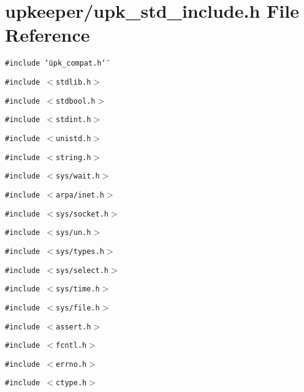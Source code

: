 \section{upkeeper/upk\_\-std\_\-include.h File Reference}
\label{upk__std__include_8h}
{\tt \#include \char`\"{}upk\_\-compat.h\char`\"{}}\par
{\tt \#include $<$stdlib.h$>$}\par
{\tt \#include $<$stdbool.h$>$}\par
{\tt \#include $<$stdint.h$>$}\par
{\tt \#include $<$unistd.h$>$}\par
{\tt \#include $<$string.h$>$}\par
{\tt \#include $<$sys/wait.h$>$}\par
{\tt \#include $<$arpa/inet.h$>$}\par
{\tt \#include $<$sys/socket.h$>$}\par
{\tt \#include $<$sys/un.h$>$}\par
{\tt \#include $<$sys/types.h$>$}\par
{\tt \#include $<$sys/select.h$>$}\par
{\tt \#include $<$sys/time.h$>$}\par
{\tt \#include $<$sys/file.h$>$}\par
{\tt \#include $<$assert.h$>$}\par
{\tt \#include $<$fcntl.h$>$}\par
{\tt \#include $<$errno.h$>$}\par
{\tt \#include $<$ctype.h$>$}\par
